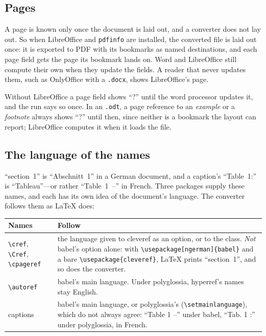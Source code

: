 \documentclass[11pt,a4paper]{article}
\newcommand{\cs}[1]{\texttt{\textbackslash #1}}
\newcommand{\file}[1]{\texttt{#1}}
\newcommand{\pkg}[1]{\textsf{#1}}
\begin{document}
\subsection{Pages}\label{sec:pages}

A page is known only once the document is laid out, and a converter does not
lay out. So when LibreOffice and \texttt{pdfinfo} are installed, the converted
file is laid out once: it is exported to PDF with its bookmarks as named
destinations, and each page field gets the page its bookmark lands on. Word and
LibreOffice still compute their own when they update the fields. A reader that
never updates them, such as OnlyOffice with a \file{.docx}, shows LibreOffice's page.

Without LibreOffice a page field shows ``?'' until the word processor updates
it, and the run says so once. In an \file{.odt}, a page reference to an
\emph{example} or a \emph{footnote} always shows ``?'' until then, since
neither is a bookmark the layout can report; LibreOffice computes it when it
loads the file.

\subsection{The language of the names}\label{sec:names}

``section~1'' is ``Abschnitt~1'' in a German document, and a caption's
``Table~1:'' is ``Tableau''---or rather ``Table~1~--'' in French. Three packages
supply these names, and each has its own idea of the document's language.
The converter follows them as \LaTeX{} does:

\begin{center}\small
\begin{tabular}{@{}p{4.2cm} p{8.8cm}@{}}
\toprule
\textbf{Names} & \textbf{Follow}\\
\midrule
\cs{cref}, \cs{Cref}, \cs{cpageref} & the language given to \pkg{cleveref} as an
  option, or to the class. \emph{Not} \pkg{babel}'s option alone: with
  \texttt{\cs{usepackage}[ngerman]\{babel\}} and a bare
  \texttt{\cs{usepackage}\{cleveref\}}, \LaTeX{} prints ``section~1'', and so
  does the converter.\\
\cs{autoref} & \pkg{babel}'s main language. Under \pkg{polyglossia},
  hyperref's names stay English.\\
captions & \pkg{babel}'s main language, or \pkg{polyglossia}'s
  (\cs{setmainlanguage}), which do not always agree: ``Table 1 --'' under
  babel, ``Tab. 1 :'' under polyglossia, in French.\\
\bottomrule
\end{tabular}
\end{center}
\end{document}
